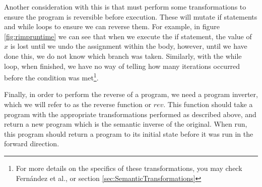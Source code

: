 Another consideration with this is that \rimp must perform some transformations to ensure the program is reversible before execution. These will mutate if statements and while loops to ensure we can reverse them. For example, in figure \ref{fig:rimpruntime} we can see that when we execute the if statement, the value of $x$ is lost until we undo the assignment within the body, however, until we have done this, we do not know which branch was taken. Similarly, with the while loop, when finished, we have no way of telling how many iterations occurred before the condition was met\footnote{For more details on the specifics of these transformations, you may check Fern{\'a}ndez et al.\cite{Rimp}, or section \ref{sec:SemanticTransformations}}.

Finally, in order to perform the reverse of a program, we need a program inverter, which we will refer to as the reverse function or $rev$. This function should take a program with the appropriate transformations performed as described above, and return a new program which is the semantic inverse of the original. When run, this program should return a program to its initial state before it was run in the forward direction.